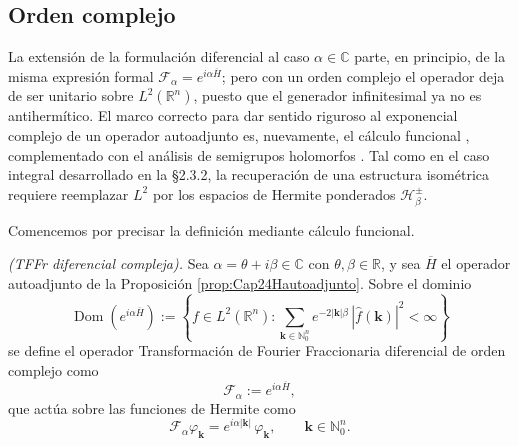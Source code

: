        \subsection{Orden complejo}

            La extensión de la formulación diferencial al caso $\alpha \in \mathbb{C}$ parte, en principio, de la misma expresión formal $\mathcal{F}_\alpha = e^{i\alpha \overline{H}}$; pero con un orden complejo el operador deja de ser unitario sobre $L^2(\mathbb{R}^n)$, puesto que el generador infinitesimal ya no es antihermítico. El marco correcto para dar sentido riguroso al exponencial complejo de un operador autoadjunto es, nuevamente, el cálculo funcional \citep[Ch. VIII]{reed1980methods}, complementado con el análisis de semigrupos holomorfos \citep{engel2000one}. Tal como en el caso integral desarrollado en la §2.3.2, la recuperación de una estructura isométrica requiere reemplazar $L^2$ por los espacios de Hermite ponderados $\mathcal{H}_\beta^\pm$.

            Comencemos por precisar la definición mediante cálculo funcional.

            \begin{definition}\label{def:Cap24TFFrDifComp}
                \textit{(TFFr diferencial compleja).} Sea $\alpha = \theta + i\beta \in \mathbb{C}$ con $\theta, \beta \in \mathbb{R}$, y sea $\overline{H}$ el operador autoadjunto de la Proposición \ref{prop:Cap24Hautoadjunto}. Sobre el dominio
                \begin{equation}\label{eq:Cap24DomFcomplex}
                    \operatorname{Dom}\left(e^{i\alpha \overline{H}}\right) := \left\{ f \in L^2(\mathbb{R}^n) : \sum_{\boldsymbol{k}\in \mathbb{N}_0^n} e^{-2|\boldsymbol{k}|\beta}\,|\hat{f}(\boldsymbol{k})|^2 < \infty \right\}
                \end{equation}
                se define el operador Transformación de Fourier Fraccionaria diferencial de orden complejo como
                \begin{equation}\label{eq:Cap24TFFrDifComp}
                    \mathcal{F}_\alpha := e^{i\alpha \overline{H}},
                \end{equation}
                que actúa sobre las funciones de Hermite como
                \begin{equation}\label{eq:Cap24AccionBaseComp}
                    \mathcal{F}_\alpha \varphi_{\boldsymbol{k}} = e^{i\alpha |\boldsymbol{k}|}\,\varphi_{\boldsymbol{k}},\qquad \boldsymbol{k}\in \mathbb{N}_0^n.
                \end{equation}
            \end{definition}

